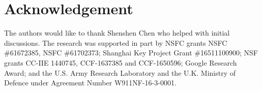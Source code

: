 \section{Acknowledgement}

The authors would like to thank Shenshen Chen who helped with initial discussions. The research was supported in part by NSFC grants NSFC \#61672385, NSFC \#61702373; Shanghai Key Project Grant \#16511100900; NSF grants CC-IIE 1440745, CCF-1637385 and CCF-1650596; Google Research Award; and the U.S. Army Research Laboratory and the U.K. Ministry of Defence under Agreement Number W911NF-16-3-0001.

